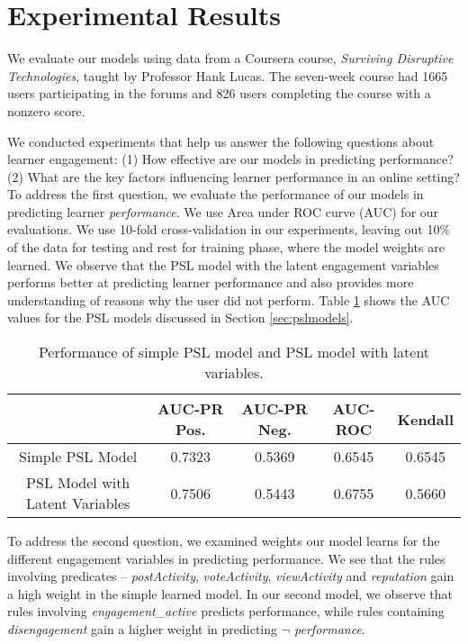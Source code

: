 
\section{Experimental Results}
\label{sec:experiments}

We evaluate our models using data from a Coursera course, \emph{Surviving Disruptive Technologies}, taught by Professor Hank Lucas. The seven-week course had 1665 users participating in the forums and 826 users completing the course with a nonzero score. 

We conducted experiments that help us answer the following questions about learner engagement: (1) How effective are our models in predicting performance? (2) What are the key factors influencing learner performance in an online setting? \\

To address the first question, we evaluate the performance of our models in predicting learner \emph{performance}. We use Area under ROC curve (AUC) for our evaluations. We use 10-fold cross-validation in our experiments, leaving out 10\% of the data for testing and rest for training phase, where the model weights are learned. We observe that the PSL model with the latent engagement variables performs better at predicting learner performance and also provides more understanding of reasons why the user did not perform. Table \ref{table:results} shows the AUC values for the PSL models discussed in Section \ref{sec:pslmodels}.

\begin{table} [ht]
\begin{tabular}{ccccc}
\toprule
& AUC-PR Pos. & AUC-PR Neg.& AUC-ROC & Kendall \\
\midrule
Simple PSL Model & 0.7323 & 0.5369 &0.6545 & 0.6545 \\
PSL Model with Latent Variables &0.7506 & 0.5443 & 0.6755 &0.5660 \\
\bottomrule
\end{tabular}
\caption{Performance of simple PSL model and PSL model with latent variables.}
\label{table:results}
\end{table}

To address the second question, we examined weights our model learns for the different engagement variables in predicting performance. We see that the rules involving predicates -- \emph{postActivity}, \emph{voteActivity}, \emph{viewActivity} and \emph{reputation} gain a high weight in the simple learned model. In our second model, we observe that rules involving \emph{engagement\_active} predicts performance, while rules containing \emph{disengagement} gain a higher weight in predicting \emph{$\neg$ performance}.

